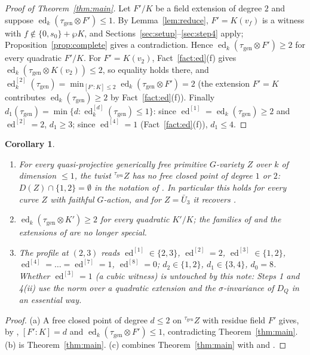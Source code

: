 \documentclass[11pt]{amsart}
\newtheorem{corollary}[theorem]{Corollary}
\theoremstyle{definition}
\theoremstyle{remark}
\newcommand{\ed}{\operatorname{ed}}
\newcommand{\edd}[1]{\ed^{[#1]}}
\newcommand{\gen}{\mathrm{gen}}
\begin{document}
\begin{proof}[Proof of Theorem~\ref{thm:main}]
Let $F'/K$ be a field extension of degree $2$ and suppose $\ed_k(\tau_{\gen}\otimes F')\le1$.
By Lemma~\ref{lem:reduce}, $F'=K(v_f)$ is a witness with $f\notin\{0,s_0\}+\wp K$, and
Sections~\ref{sec:setup}--\ref{sec:step4} apply; Proposition~\ref{prop:complete} gives a
contradiction. Hence $\ed_k(\tau_{\gen}\otimes F')\ge2$ for every quadratic $F'/K$. For
$F'=K(v_2)$, Fact~\ref{fact:ed}(f) gives $\ed_k(\tau_{\gen}\otimes K(v_2))\le2$, so equality
holds there, and $\edd2_k(\tau_{\gen})=\min_{[F':K]\le2}\ed_k(\tau_{\gen}\otimes F')=2$
(the extension $F'=K$ contributes $\ed_k(\tau_{\gen})\ge2$ by Fact~\ref{fact:ed}(f)).
Finally $d_1(\tau_{\gen})=\min\{d:\edd d_k(\tau_{\gen})\le1\}$: since
$\edd1=\ed_k(\tau_{\gen})\ge2$ and $\edd2=2$, $d_1\ge3$; since $\edd4=1$
(Fact~\ref{fact:ed}(f)), $d_1\le4$.
\end{proof}

\begin{corollary}\label{cor:consequences}
\begin{enumerate}[label=\textup{(\alph*)}]
\item For every quasi-projective generically free primitive $G$-variety $Z$ over $k$ of
dimension $\le1$, the twist ${}^{\tau_{\gen}}Z$ has no free closed point of degree $1$ or
$2$: $D(Z)\cap\{1,2\}=\emptyset$ in the notation of \cite[Definition 4.3]{P}. In
particular this holds for every curve $Z$ with faithful $G$-action, and for
$Z=\bar U_3$ it recovers \cite[Corollary 11.7]{A}.
\item $\ed_k(\tau_{\gen}\otimes K')\ge2$ for every quadratic $K'/K$; the families of
\cite[Theorem 11.9]{A} and the extensions of \cite[Theorem 7.3]{P} are no longer special.
\item The profile at $(2,3)$ reads
$\edd1\in\{2,3\}$, $\edd2=2$, $\edd3\in\{1,2\}$, $\edd4=\dots=\edd7=1$, $\edd8=0$;
$d_2\in\{1,2\}$, $d_1\in\{3,4\}$, $d_0=8$. Whether $\edd3=1$ (a cubic witness) is
untouched by this note: Steps 1 and 4(ii) use the norm over a quadratic extension and the
$\sigma$-invariance of $D_Q$ in an essential way.
\end{enumerate}
\end{corollary}

\begin{proof}
(a) A free closed point of degree $d\le2$ on ${}^{\tau_{\gen}}Z$ with residue field $F'$
gives, by \cite[Theorem 4.2, (2)$\Rightarrow$(3)$\Rightarrow$(1)]{P}, $[F':K]=d$ and
$\ed_k(\tau_{\gen}\otimes F')\le1$, contradicting Theorem~\ref{thm:main}. (b) is
Theorem~\ref{thm:main}. (c) combines Theorem~\ref{thm:main} with \cite[Theorem 7.1]{P}
and \cite[Theorem 11.16]{A}.
\end{proof}
\end{document}
